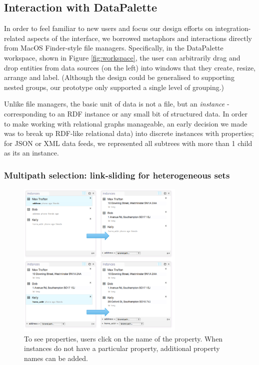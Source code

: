 \documentclass{sigchi}
\begin{document}
\subsection{Interaction with DataPalette}
In order to feel familiar to new users and focus our design efforts on integration-related aspects of the interface, we borrowed metaphors and interactions directly from MacOS Finder-style file managers.  Specifically, in the DataPalette workspace, shown in Figure \ref{fig:workspace}, the user can arbitrarily drag and drop entities from data sources (on the left) into windows that they create, resize, arrange and label. (Although the design could be generalised to supporting nested groups, our prototype only supported a single level of grouping.)

Unlike file managers, the basic unit of data is not a file, but an \emph{instance} - corresponding to an RDF instance or any small bit of structured data. In order to make working with relational graphs manageable, an early decision we made was to break up RDF-like relational data) into discrete instances with properties; for JSON or XML data feeds, we represented all subtrees with more than 1 child as its an instance.  

\subsubsection{Multipath selection: link-sliding for heterogeneous sets}

\begin{figure}[htbp]
\begin{center}
\includegraphics[width=8cm]{img/multipathing}
\caption{To see properties, users click on the name of the property. When instances do not have a particular property, additional property names can be added.}
\label{fig:multipathing}
\end{center}
\end{figure}
\end{document}
